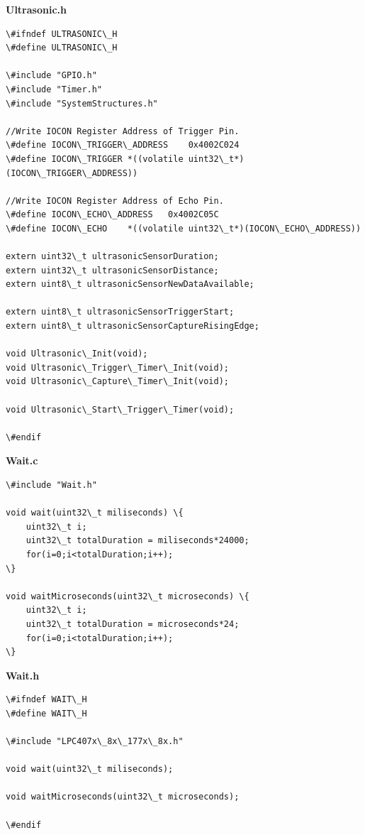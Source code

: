 \documentclass{article}
\begin{document}
\linebreak
\textbf{Ultrasonic.h}
\begin{lstlisting}
\#ifndef ULTRASONIC\_H
\#define ULTRASONIC\_H

\#include "GPIO.h"
\#include "Timer.h"
\#include "SystemStructures.h"

//Write IOCON Register Address of Trigger Pin.
\#define IOCON\_TRIGGER\_ADDRESS	0x4002C024
\#define IOCON\_TRIGGER	*((volatile uint32\_t*)(IOCON\_TRIGGER\_ADDRESS))

//Write IOCON Register Address of Echo Pin.
\#define IOCON\_ECHO\_ADDRESS	0x4002C05C
\#define IOCON\_ECHO	*((volatile uint32\_t*)(IOCON\_ECHO\_ADDRESS))

extern uint32\_t ultrasonicSensorDuration;
extern uint32\_t ultrasonicSensorDistance;
extern uint8\_t ultrasonicSensorNewDataAvailable;

extern uint8\_t ultrasonicSensorTriggerStart;
extern uint8\_t ultrasonicSensorCaptureRisingEdge;

void Ultrasonic\_Init(void);
void Ultrasonic\_Trigger\_Timer\_Init(void);
void Ultrasonic\_Capture\_Timer\_Init(void);

void Ultrasonic\_Start\_Trigger\_Timer(void);

\#endif
\end{lstlisting}
\linebreak
\textbf{Wait.c}
\begin{lstlisting}
\#include "Wait.h"

void wait(uint32\_t miliseconds) \{
	uint32\_t i;
	uint32\_t totalDuration = miliseconds*24000;
	for(i=0;i<totalDuration;i++);
\}

void waitMicroseconds(uint32\_t microseconds) \{
	uint32\_t i;
	uint32\_t totalDuration = microseconds*24;
	for(i=0;i<totalDuration;i++);
\}
\end{lstlisting}
\linebreak
\textbf{Wait.h}
\begin{lstlisting}
\#ifndef WAIT\_H
\#define WAIT\_H

\#include "LPC407x\_8x\_177x\_8x.h"

void wait(uint32\_t miliseconds);

void waitMicroseconds(uint32\_t microseconds);

\#endif
\end{lstlisting}
\end{document}
